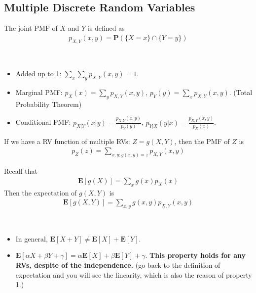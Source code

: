 \subsection{Multiple Discrete Random Variables}
\begin{definition}
    The joint PMF of $X$ and $Y$ is defined as
    \begin{align}
        p_{X, Y}(x, y) = \mathbf{P}(\{X = x\} \cap \{Y = y\})
    \end{align}
\end{definition}
\begin{property} ~
    \begin{itemize}
        \item Added up to 1: $\sum_x \sum_y p_{X, Y}(x, y) = 1$.
        \item Marginal PMF: $p_{X}(x) = \sum_y p_{X, Y}(x, y)$, $p_{Y}(y) = \sum_x p_{X, Y}(x, y)$. (Total Probability Theorem)
        \item Conditional PMF: $p_{X|Y}(x|y) = \frac{p_{X, Y}(x, y)}{p_{Y}(y)}$, $p_{Y|X}(y|x) = \frac{p_{X, Y}(x, y)}{p_{X}(x)}$.
    \end{itemize}
\end{property}
If we have a RV function of multiple RVs: $Z = g(X, Y)$, then the PMF of $Z$ is
\begin{align}
    p_{Z}(z) = \sum_{x, y: g(x, y) = z} p_{X, Y}(x, y)
\end{align}
\begin{definition}
    Recall that 
    \begin{align*}
        \mathbf{E}[g(X)] = \sum_{x} g(x) p_{X}(x)
    \end{align*}
    Then the expectation of $g(X, Y)$ is
    \begin{align}
        \mathbf{E}[g(X, Y)] = \sum_{x, y} g(x, y) p_{X, Y}(x, y)
    \end{align}
\end{definition}
\begin{property} ~
    \begin{itemize}
        \item In general, $\mathbf{E}[X + Y] \neq \mathbf{E}[X] + \mathbf{E}[Y]$.
        \item $\mathbf{E}[\alpha X + \beta Y + \gamma] = \alpha \mathbf{E}[X] + \beta \mathbf{E}[Y] + \gamma$. \textbf{This property holds for any RVs, despite of the independence.} (go back to the definition of expectation and you will see the linearity, which is also the reason of property 1.)
    \end{itemize}
\end{property}

